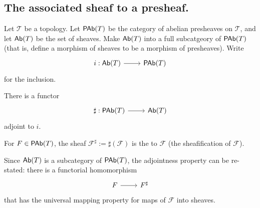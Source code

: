 \documentclass [11 pt, oneside] {article}
\begin{document}
\subsection{The associated sheaf to a presheaf.}
Let $\mathscr{T}$ be a topology. Let $\textsf{PAb}(\relax{T})$ be the category of abelian presheaves on $\mathscr{T}$, and let $\textsf{Ab}(\relax{T})$ be the set of sheaves. 
Make $\textsf{Ab}(\relax{T})$ into a full subcatgeory of $\textsf{PAb}(\relax{T})$ (that is, define a morphism of sheaves to be a morphism of presheaves).
Write
 \[
\begin{tikzcd}
	i:\catn{Ab}(\mathscr{T}) \ar[r]& \catn{PAb}(\mathscr{T})
\end{tikzcd}
\]
for the inclusion.

\begin{theorem}\label{t_{1.1}}
There is a functor 
\[
\begin{tikzcd}
	\sharp : \catn{PAb}(\mathscr{T})\ar[r]& \catn{Ab}(\mathscr{T})
\end{tikzcd}
\]
adjoint to $i$.
\end{theorem}

For $\relax{F}\in \textsf{PAb}(\relax{T})$, the sheaf $\mathscr{F}^{\sharp} := \sharp(\mathscr{F})$ is the  to $\mathscr{F}$ (the sheafification of $\mathscr{F}$). 

Since $\textsf{Ab}(\relax{T})$ is a subcategory of $\textsf{PAb}(\relax{T})$, the adjointness property can be re-stated: there is a functorial homomorphism
\[
\begin{tikzcd}
	\mathscr{F}\ar[r]& \mathscr{F}^{\sharp}
\end{tikzcd}
\]
that has the universal mapping property for maps of $\mathscr{F}$ into sheaves. 
\end{document}
